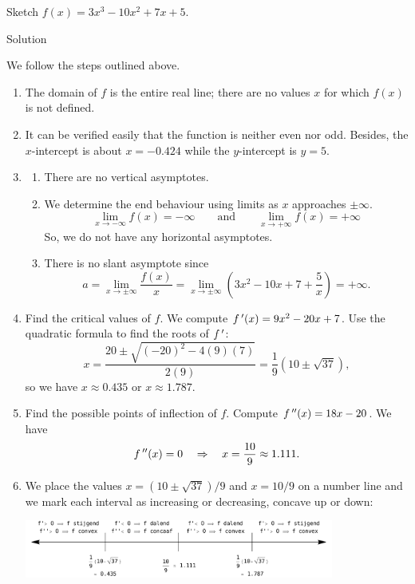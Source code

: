 \begin{example}\label{ex_sketch1}
Sketch $f(x) = 3x^3-10x^2+7x+5$.

Solution 

We follow the steps outlined above.
\begin{enumerate}
\item		The domain of $f$ is the entire real line; there are no values $x$ for which $f(x)$ is not defined.
\item It can be verified easily that the function is neither even nor odd. Besides, the $x$-intercept is about $x=-0.424$ while the $y$-intercept is $y=5$.
\item \begin{enumerate}
\item		There are no vertical asymptotes.
\item		We determine the end behaviour using limits as $x$ approaches $\pm \infty$.				
			$$\lim_{x\to -\infty} f(x) = -\infty \qquad \text{and} \qquad \lim_{x\to +\infty}f(x) = +\infty$$
			So, we do not have any horizontal asymptotes.
\item There is no slant asymptote since
$$
a=\lim_{x\to \pm\infty} \dfrac{f(x)}{x}=\lim_{x\to \pm\infty}\left(3x^2-10x+7+\frac{5}{x}\right)=+\infty.
$$
\end{enumerate}
\item		Find the critical values of $f$. We compute $f\,'(x) = 9x^2-20x+7$. Use the quadratic formula to find the roots of $f\,'$:
				$$x = \frac{20\pm \sqrt{(-20)^2-4(9)(7)}}{2(9)} = \frac19\left(10\pm\sqrt{37}\right),$$
so we have $x\approx 0.435$ or $x\approx 1.787.$
\item		Find the possible points of inflection of $f$. Compute $f\,''(x) = 18x-20$. We have $$f\,''(x) = 0 \quad\Rightarrow\quad x= \dfrac{10}{9}\approx 1.111.$$

\item		We place the values $x=(10\pm\sqrt{37})/9$ and $x=10/9$ on a number line and we mark each interval as increasing or decreasing, concave up or down:

	\begin{center}
			\includegraphics[width=0.8\textwidth]{fig_behaviour_24}
	\end{center}
	

\end{enumerate}
\end{example}
